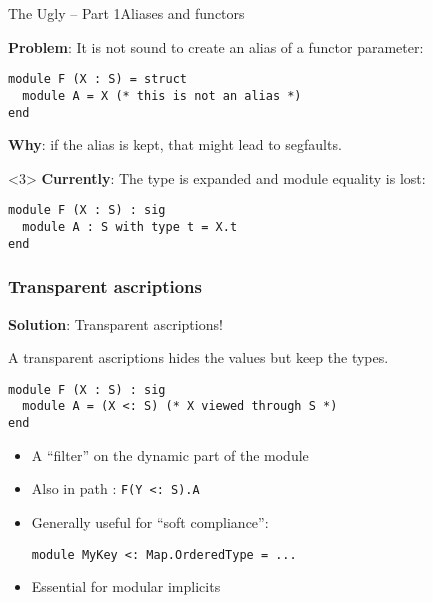 \documentclass[aspectratio=169,dvipsnames,svgnames,10pt]{beamer}
\begin{document}
\begin{frame}{The Ugly -- Part 1\hfill Aliases and functors}
  
  {\bf Problem}: It is not sound to create an alias of a functor parameter:
\begin{verbatim}
module F (X : S) = struct
  module A = X (* this is not an alias *)
end
\end{verbatim}
  {\bf Why}: if the alias is kept, that might lead to segfaults.

    \begin{onlyenv}<3>
  {\bf Currently}: The type is expanded and module equality is lost:
\begin{verbatim}
module F (X : S) : sig
  module A : S with type t = X.t
end
\end{verbatim}
\end{onlyenv}
  
\end{frame}

\begin{frame}[fragile]
  \frametitle{Transparent ascriptions}

  {\bf Solution}: Transparent ascriptions!

  A transparent ascriptions hides the values but keep the types.
\begin{verbatim}
module F (X : S) : sig
  module A = (X <: S) (* X viewed through S *)
end
\end{verbatim}

  \pause
  \begin{itemize}
  \item A ``filter'' on the dynamic part of the module
  \item Also in path : \texttt{F(Y <:\ S).A}
  \item Generally useful for ``soft compliance'':
\begin{verbatim}
module MyKey <: Map.OrderedType = ...
\end{verbatim}
  \item Essential for modular implicits
  \end{itemize}
  
\end{frame}
\end{document}
